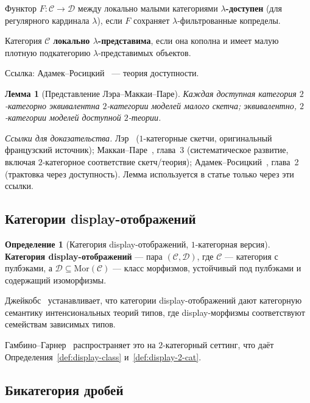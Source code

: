 \documentclass[11pt]{article}
\theoremstyle{plain}
\newtheorem{lemma}[theorem]{Лемма}
\theoremstyle{definition}
\newtheorem{definition}[theorem]{Определение}
\newcommand{\cC}{\mathcal{C}}
\newcommand{\cD}{\mathcal{D}}
\newcommand{\Mor}{\mathrm{Mor}}
\begin{document}
Функтор $F : \cC \to \cD$ между локально малыми категориями \textbf{$\lambda$-доступен} (для регулярного кардинала $\lambda$), если $F$ сохраняет $\lambda$-фильтрованные копределы.

Категория $\cC$ \textbf{локально $\lambda$-представима}, если она кополна и имеет малую плотную подкатегорию $\lambda$-представимых объектов.

Ссылка: Адамек--Росицкий~\cite{AdamekRosicky1994} — теория доступности.

\begin{lemma}[Представление Лэра--Маккаи--Паре]\label{lem:lair}
Каждая доступная категория $2$-категорно эквивалентна $2$-категории моделей малого скетча; эквивалентно, $2$-категории моделей доступной $2$-теории.
\end{lemma}

\noindent\emph{Ссылки для доказательства.} Лэр~\cite{Lair1981} ($1$-категорные скетчи, оригинальный французский источник); Маккаи--Паре~\cite{MakkaiPare1989}, глава~3 (систематическое развитие, включая $2$-категорное соответствие скетч/теория); Адамек--Росицкий~\cite{AdamekRosicky1994}, глава~2 (трактовка через доступность). Лемма используется в статье только через эти ссылки.

\subsection{Категории display-отображений}

\begin{definition}[Категория display-отображений, $1$-категорная версия]\label{def:display-1cat}
\textbf{Категория display-отображений} — пара $(\cC, \cD)$, где $\cC$ — категория с пулбэками, а $\cD \subseteq \Mor(\cC)$ — класс морфизмов, устойчивый под пулбэками и содержащий изоморфизмы.
\end{definition}

Джейкобс~\cite{Jacobs1999} устанавливает, что категории display-отображений дают категорную семантику интенсиональных теорий типов, где display-морфизмы соответствуют семействам зависимых типов.

Гамбино--Гарнер~\cite{GambinoGarner2008} распространяет это на $2$-категорный сеттинг, что даёт Определения~\ref{def:display-class} и~\ref{def:display-2-cat}.

\subsection{Бикатегория дробей}
\end{document}
